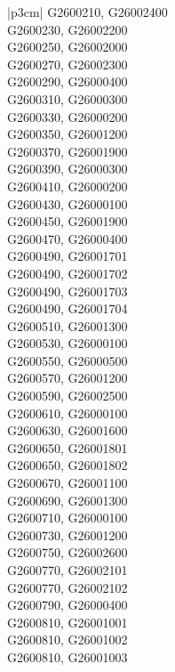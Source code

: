 \begin{customLongTable}{ |p{3cm}| }
G2600210, G26002400 \\ \hline
G2600230, G26002200 \\ \hline
G2600250, G26002000 \\ \hline
G2600270, G26002300 \\ \hline
G2600290, G26000400 \\ \hline
G2600310, G26000300 \\ \hline
G2600330, G26000200 \\ \hline
G2600350, G26001200 \\ \hline
G2600370, G26001900 \\ \hline
G2600390, G26000300 \\ \hline
G2600410, G26000200 \\ \hline
G2600430, G26000100 \\ \hline
G2600450, G26001900 \\ \hline
G2600470, G26000400 \\ \hline
G2600490, G26001701 \\ \hline
G2600490, G26001702 \\ \hline
G2600490, G26001703 \\ \hline
G2600490, G26001704 \\ \hline
G2600510, G26001300 \\ \hline
G2600530, G26000100 \\ \hline
G2600550, G26000500 \\ \hline
G2600570, G26001200 \\ \hline
G2600590, G26002500 \\ \hline
G2600610, G26000100 \\ \hline
G2600630, G26001600 \\ \hline
G2600650, G26001801 \\ \hline
G2600650, G26001802 \\ \hline
G2600670, G26001100 \\ \hline
G2600690, G26001300 \\ \hline
G2600710, G26000100 \\ \hline
G2600730, G26001200 \\ \hline
G2600750, G26002600 \\ \hline
G2600770, G26002101 \\ \hline
G2600770, G26002102 \\ \hline
G2600790, G26000400 \\ \hline
G2600810, G26001001 \\ \hline
G2600810, G26001002 \\ \hline
G2600810, G26001003 \\ \hline

\end{customLongTable}
